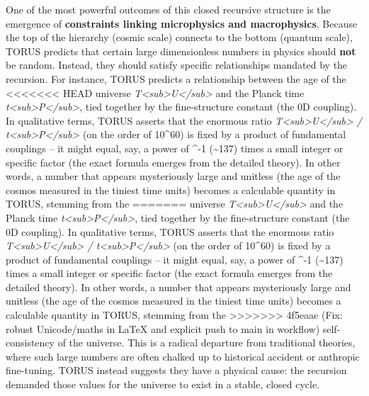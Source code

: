 \documentclass[]{article}
\begin{document}
One of the most powerful outcomes of this closed recursive structure is
the emergence of \textbf{constraints linking microphysics and
macrophysics}. Because the top of the hierarchy (cosmic scale) connects
to the bottom (quantum scale), TORUS predicts that certain large
dimensionless numbers in physics should \textbf{not} be random. Instead,
they should satisfy specific relationships mandated by the recursion.
For instance, TORUS predicts a relationship between the age of the
<<<<<<< HEAD
universe \emph{T\textless sub\textgreater U\textless/sub\textgreater{}}
and the Planck time
\emph{t\textless sub\textgreater P\textless/sub\textgreater{}}, tied
together by the fine-structure constant \alpha (the 0D coupling). In
qualitative terms, TORUS asserts that the enormous ratio
\emph{T\textless sub\textgreater U\textless/sub\textgreater{} /
t\textless sub\textgreater P\textless/sub\textgreater{}} (on the order
of 10\^{}60) is fixed by a product of fundamental couplings -- it might
equal, say, a power of \alpha\^{}-1 (\textasciitilde137) times a small
integer or specific factor (the exact formula emerges from the detailed
theory). In other words, a number that appears mysteriously large and
unitless (the age of the cosmos measured in the tiniest time units)
becomes a calculable quantity in TORUS, stemming from the
=======
universe
\emph{T\textless{}sub\textgreater{}U\textless{}/sub\textgreater{}} and
the Planck time
\emph{t\textless{}sub\textgreater{}P\textless{}/sub\textgreater{}}, tied
together by the fine-structure constant \alpha (the 0D coupling). In
qualitative terms, TORUS asserts that the enormous ratio
\emph{T\textless{}sub\textgreater{}U\textless{}/sub\textgreater{} /
t\textless{}sub\textgreater{}P\textless{}/sub\textgreater{}} (on the
order of 10\^{}60) is fixed by a product of fundamental couplings -- it
might equal, say, a power of \alpha\^{}-1 (\textasciitilde{}137) times a
small integer or specific factor (the exact formula emerges from the
detailed theory). In other words, a number that appears mysteriously
large and unitless (the age of the cosmos measured in the tiniest time
units) becomes a calculable quantity in TORUS, stemming from the
>>>>>>> 4f5eaae (Fix: robust Unicode/maths in LaTeX and explicit push to main in workflow)
self-consistency of the universe. This is a radical departure from
traditional theories, where such large numbers are often chalked up to
historical accident or anthropic fine-tuning. TORUS instead suggests
they have a physical cause: the recursion demanded those values for the
universe to exist in a stable, closed cycle.
\end{document}
